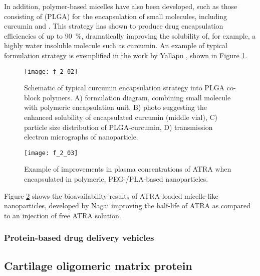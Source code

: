 \begin{refsection}
In addition, polymer-based micelles have also been developed, such as those
consisting of  (PLGA) for the
encapsulation of small molecules, including curcumin and
.\cite{Li2009,Yallapu2010b} This strategy has
shown to produce drug encapsulation efficiencies of up to \SI{90}{\percent},
dramatically improving the solubility of, for example, a highly water insoluble molecule
such as curcumin. An example of typical formulation strategy is exemplified in
the work by Yallapu , shown in Figure
\ref{fig:PLA_curcumin_example}.\cite{Yallapu2010b}
\begin{figure}[h!] \centering \texttt{[image: f\_2\_02]}
    \caption[Schematic of typical curcumin encapsulation strategy into PLGA
        co-block polymers.
    ]{Schematic of typical curcumin encapsulation strategy into PLGA co-block
    polymers. A) formulation diagram, combining small molecule with polymeric
encapsulation unit, B) photo suggesting the enhanced solubility of encapsulated
curcumin (middle vial), C) particle size distribution of PLGA-curcumin, D)
transmission electron micrographs of
nanoparticle.\cite{Yallapu2010b}}\label{fig:PLA_curcumin_example} \end{figure}
\begin{figure}[h!] \centering \texttt{[image: f\_2\_03]}
    \caption[Example of improvements in plasma concentrations of ATRA when
    encapsulated in polymeric, PEG-/PLA-based nanoparticles.]{Example of improvements in plasma concentrations of ATRA when
    encapsulated in polymeric, PEG-/PLA-based
    nanoparticles.\cite{Li2009}}\label{fig:PLA_ATRA_example} \end{figure}
Figure \ref{fig:PLA_ATRA_example} shows the bioavailability results of
ATRA-loaded micelle-like nanoparticles, developed by Nagai \cite{Li2009} improving the half-life of ATRA as compared to an injection of
free ATRA solution.

\subsubsection{Protein-based drug delivery vehicles}

\subsection{Cartilage oligomeric matrix protein}


\end{refsection}

